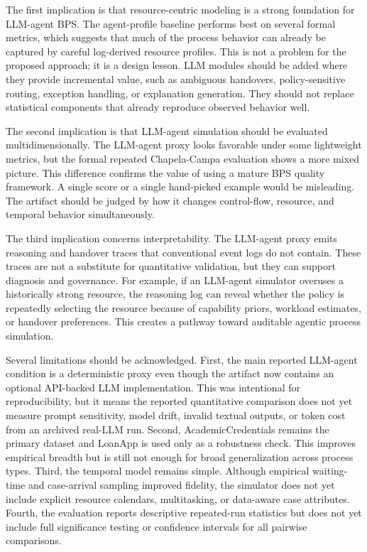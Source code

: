 The first implication is that resource-centric modeling is a strong
foundation for LLM-agent BPS. The agent-profile baseline performs best
on several formal metrics, which suggests that much of the process
behavior can already be captured by careful log-derived resource
profiles. This is not a problem for the proposed approach; it is a
design lesson. LLM modules should be added where they provide
incremental value, such as ambiguous handovers, policy-sensitive
routing, exception handling, or explanation generation. They should not
replace statistical components that already reproduce observed behavior
well.

The second implication is that LLM-agent simulation should be evaluated
multidimensionally. The LLM-agent proxy looks favorable under some
lightweight metrics, but the formal repeated Chapela-Campa evaluation
shows a more mixed picture. This difference confirms the value of using
a mature BPS quality framework. A single score or a single hand-picked
example would be misleading. The artifact should be judged by how it
changes control-flow, resource, and temporal behavior simultaneously.

The third implication concerns interpretability. The LLM-agent proxy
emits reasoning and handover traces that conventional event logs do not
contain. These traces are not a substitute for quantitative validation,
but they can support diagnosis and governance. For example, if an
LLM-agent simulator overuses a historically strong resource, the
reasoning log can reveal whether the policy is repeatedly selecting the
resource because of capability priors, workload estimates, or handover
preferences. This creates a pathway toward auditable agentic process
simulation.

Several limitations should be acknowledged. First, the main reported
LLM-agent condition is a deterministic proxy even though the artifact now
contains an optional API-backed LLM implementation. This was intentional
for reproducibility, but it means the reported quantitative comparison
does not yet measure prompt sensitivity, model drift, invalid textual
outputs, or token cost from an archived real-LLM run. Second,
AcademicCredentials remains the primary dataset and LoanApp is used only
as a robustness check. This improves empirical breadth but is still not
enough for broad generalization across process types. Third, the temporal model remains
simple. Although empirical waiting-time and case-arrival sampling
improved fidelity, the simulator does not yet include explicit resource
calendars, multitasking, or data-aware case attributes. Fourth, the
evaluation reports descriptive repeated-run statistics but does not yet
include full significance testing or confidence intervals for all
pairwise comparisons.

